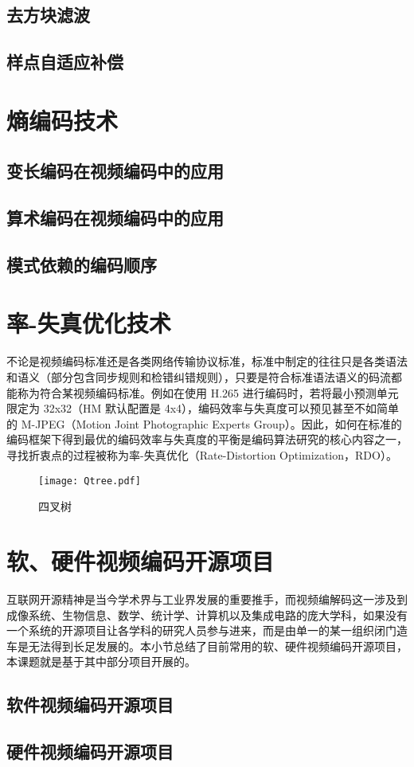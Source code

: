 \subsection{去方块滤波}
\subsection{样点自适应补偿}

\section{熵编码技术}
\subsection{变长编码在视频编码中的应用}
\subsection{算术编码在视频编码中的应用}
\subsection{模式依赖的编码顺序}

\section{率-失真优化技术}
不论是视频编码标准还是各类网络传输协议标准，标准中制定的往往只是各类语法和语义（部分包含同步规则和检错纠错规则），只要是符合标准语法语义的码流都能称为符合某视频编码标准。例如在使用 H.265 进行编码时，若将最小预测单元限定为 32x32（HM 默认配置是 4x4），编码效率与失真度可以预见甚至不如简单的 M-JPEG（Motion Joint Photographic Experts Group）。因此，如何在标准的编码框架下得到最优的编码效率与失真度的平衡是编码算法研究的核心内容之一，寻找折衷点的过程被称为率-失真优化（Rate-Distortion Optimization，RDO）。
\begin{figure}[htb]
    \centering
    \texttt{[image: Qtree.pdf]}
    \caption{四叉树}
\end{figure}

\section{软、硬件视频编码开源项目}
互联网开源精神是当今学术界与工业界发展的重要推手，而视频编解码这一涉及到成像系统、生物信息、数学、统计学、计算机以及集成电路的庞大学科，如果没有一个系统的开源项目让各学科的研究人员参与进来，而是由单一的某一组织闭门造车是无法得到长足发展的。本小节总结了目前常用的软、硬件视频编码开源项目，本课题就是基于其中部分项目开展的。
\subsection{软件视频编码开源项目}
\subsection{硬件视频编码开源项目}